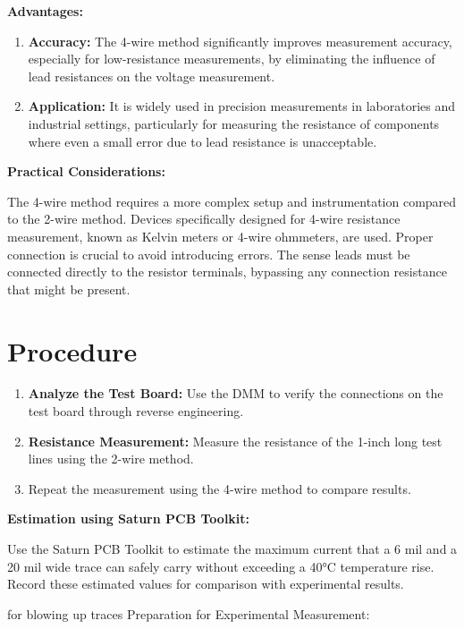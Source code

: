 \documentclass[a4paper,11pt]{article}%
\begin{document}
\textbf{Advantages:}

\begin{enumerate}
	\item \textbf{Accuracy:} The 4-wire method significantly improves measurement accuracy, especially for low-resistance measurements, by eliminating the influence of lead resistances on the voltage measurement.
	\item \textbf{Application:} It is widely used in precision measurements in laboratories and industrial settings, particularly for measuring the resistance of components where even a small error due to lead resistance is unacceptable.
\end{enumerate}


\textbf{Practical Considerations:}

The 4-wire method requires a more complex setup and instrumentation compared to the 2-wire method. Devices specifically designed for 4-wire resistance measurement, known as Kelvin meters or 4-wire ohmmeters, are used.
Proper connection is crucial to avoid introducing errors. The sense leads must be connected directly to the resistor terminals, bypassing any connection resistance that might be present.

\section{Procedure}

\begin{enumerate}
	\item \textbf{Analyze the Test Board:} Use the DMM to verify the connections on the test board through reverse engineering.
	\item \textbf{Resistance Measurement:}
	Measure the resistance of the 1-inch long test lines using the 2-wire method.
	\item Repeat the measurement using the 4-wire method to compare results.
\end{enumerate}





\textbf{Estimation using Saturn PCB Toolkit:}

Use the Saturn PCB Toolkit to estimate the maximum current that a 6 mil and a 20 mil wide trace can safely carry without exceeding a 40°C temperature rise.
Record these estimated values for comparison with experimental results.

for blowing up traces
Preparation for Experimental Measurement:
\end{document}
